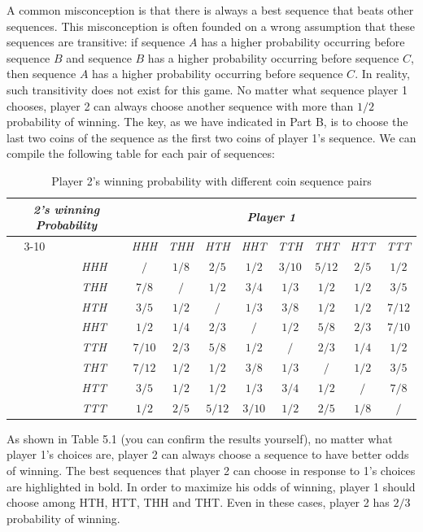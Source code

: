 \begin{solution}
A common misconception is that there is always a best sequence that beats other sequences. This
misconception is often founded on a wrong assumption that these sequences are transitive: if sequence
$A$ has a higher probability occurring before sequence $B$ and sequence $B$ has a higher probability
occurring before sequence $C$, then sequence $A$ has a higher probability occurring before sequence $C$.
In reality, such transitivity does not exist for this game. No matter what sequence player 1 chooses,
player 2 can always choose another sequence with more than $1/2$ probability of winning. The key, as we
have indicated in Part B, is to choose the last two coins of the sequence as the first two coins of
player 1's sequence. We can compile the following table for each pair of sequences:

\begin{table}[ht]
\centering
\small
\setlength{\tabcolsep}{3.5pt}
\begin{tabular}{|c|c|*{8}{c|}}
\hline
\multicolumn{2}{|c|}{\emph{2's winning Probability}} & \multicolumn{8}{c|}{\emph{Player 1}}\\
\cline{3-10}
\multirow{9}{*}{\rotatebox{90}{\emph{Player 2}}} & & \emph{HHH} & \emph{THH} & \emph{HTH} & \emph{HHT} & \emph{TTH} & \emph{THT} & \emph{HTT} & \emph{TTT}\\
\hline
& \emph{HHH} & $/$ & $1/8$ & $2/5$ & $1/2$ & $3/10$ & $5/12$ & $2/5$ & $1/2$\\
\hline
& \emph{THH} & \emph{$7/8$} & $/$ & $1/2$ & \emph{$3/4$} & $1/3$ & $1/2$ & $1/2$ & $3/5$\\
\hline
& \emph{HTH} & $3/5$ & $1/2$ & $/$ & $1/3$ & $3/8$ & $1/2$ & $1/2$ & $7/12$\\
\hline
& \emph{HHT} & $1/2$ & $1/4$ & \emph{$2/3$} & $/$ & $1/2$ & $5/8$ & \emph{$2/3$} & $7/10$\\
\hline
& \emph{TTH} & $7/10$ & \emph{$2/3$} & $5/8$ & $1/2$ & $/$ & \emph{$2/3$} & $1/4$ & $1/2$\\
\hline
& \emph{THT} & $7/12$ & $1/2$ & $1/2$ & $3/8$ & $1/3$ & $/$ & $1/2$ & $3/5$\\
\hline
& \emph{HTT} & $3/5$ & $1/2$ & $1/2$ & $1/3$ & \emph{$3/4$} & $1/2$ & $/$ & \emph{$7/8$}\\
\hline
& \emph{TTT} & $1/2$ & $2/5$ & $5/12$ & $3/10$ & $1/2$ & $2/5$ & $1/8$ & $/$\\
\hline
\end{tabular}
\caption{Player 2's winning probability with different coin sequence pairs}
\label{tab:zhou-table-5-1}
\end{table}

As shown in Table 5.1 (you can confirm the results yourself), no matter what player 1's choices are,
player 2 can always choose a sequence to have better odds of winning. The best sequences that player 2
can choose in response to 1's choices are highlighted in bold. In order to maximize his odds of winning,
player 1 should choose among HTH, HTT, THH and THT. Even in these cases, player 2 has $2/3$ probability
of winning.


\end{solution}

